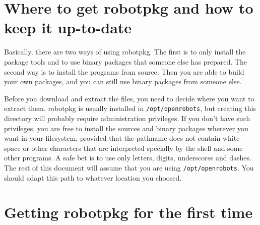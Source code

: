 %
%
%
%
%

\section{Where to get robotpkg and how to keep it up-to-date} %
\label{section:getting}

Basically, there are two ways of using robotpkg.  The  first is to only install
the package tools  and to use binary packages  that someone  else has prepared.
The second way is  to install the programs from   source. Then you are able  to
build your  own packages, and  you can still use   binary packages from someone
else.

Before you download and extract the files, you need to decide where you want to
extract  them.  robotpkg is  usually installed  in  {\tt /opt/openrobots},  but
creating this directory will probably   require administration privileges.   If
you don't have such privileges, you are free to  install the sources and binary
packages wherever you want in your filesystem, provided  that the pathname does
not contain white-space or other  characters that are interpreted specially  by
the shell and some other programs.  A safe bet is to  use only letters, digits,
underscores  and dashes. The rest of  this  document will  assume  that you are
using {\tt  /opt/openrobots}.  You should adapt  this path to whatever location
you choosed.


\section{Getting robotpkg for the first time} %

